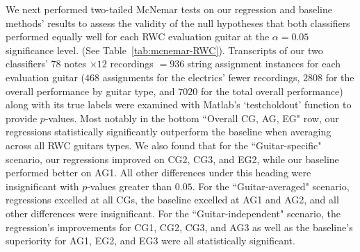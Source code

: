 \documentclass[12pt]{cmuthesis}
\begin{document}
We next performed two-tailed McNemar tests on our regression and baseline methods' results to assess the validity of the null hypotheses that both classifiers performed equally well for each RWC evaluation guitar at the $\alpha = 0.05$ significance level. (See Table~\ref{tab:mcnemar-RWC}). Transcripts of our two classifiers' $78$ notes $\times 12$ recordings $= 936$ string assignment instances for each evaluation guitar ($468$ assignments for the electrics' fewer recordings, $2808$ for the overall performance by guitar type, and $7020$ for the total overall performance) along with its true labels were examined with Matlab's `testcholdout' function to provide $p$-values. Most notably in the bottom ``Overall CG, AG, EG" row, our regressions statistically significantly outperform the baseline when averaging across all RWC guitars types. We also found that for the ``Guitar-specific" scenario, our regressions improved on CG2, CG3, and EG2, while our baseline performed better on AG1. All other differences under this heading were insignificant with $p$-values greater than $0.05$. For the ``Guitar-averaged" scenario, regressions excelled at all CGs, the baseline excelled at AG1 and AG2, and all other differences were insignificant. For the ``Guitar-independent" scenario, the regression's improvements for CG1, CG2, CG3, and AG3 as well as the baseline's superiority for AG1, EG2, and EG3 were all statistically significant. 
\end{document}
